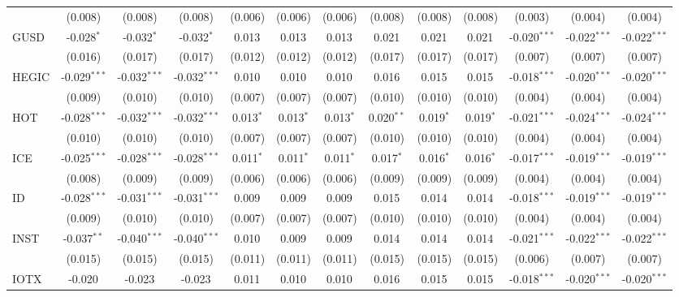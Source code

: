 \begin{table}[!htbp]
\begin{tabular}{@{\extracolsep{5pt}}lcccccccccccc}
  & (0.008) & (0.008) & (0.008) & (0.006) & (0.006) & (0.006) & (0.008) & (0.008) & (0.008) & (0.003) & (0.004) & (0.004) \\
 GUSD & -0.028$^{*}$ & -0.032$^{*}$ & -0.032$^{*}$ & 0.013$^{}$ & 0.013$^{}$ & 0.013$^{}$ & 0.021$^{}$ & 0.021$^{}$ & 0.021$^{}$ & -0.020$^{***}$ & -0.022$^{***}$ & -0.022$^{***}$ \\
  & (0.016) & (0.017) & (0.017) & (0.012) & (0.012) & (0.012) & (0.017) & (0.017) & (0.017) & (0.007) & (0.007) & (0.007) \\
 HEGIC & -0.029$^{***}$ & -0.032$^{***}$ & -0.032$^{***}$ & 0.010$^{}$ & 0.010$^{}$ & 0.010$^{}$ & 0.016$^{}$ & 0.015$^{}$ & 0.015$^{}$ & -0.018$^{***}$ & -0.020$^{***}$ & -0.020$^{***}$ \\
  & (0.009) & (0.010) & (0.010) & (0.007) & (0.007) & (0.007) & (0.010) & (0.010) & (0.010) & (0.004) & (0.004) & (0.004) \\
 HOT & -0.028$^{***}$ & -0.032$^{***}$ & -0.032$^{***}$ & 0.013$^{*}$ & 0.013$^{*}$ & 0.013$^{*}$ & 0.020$^{**}$ & 0.019$^{*}$ & 0.019$^{*}$ & -0.021$^{***}$ & -0.024$^{***}$ & -0.024$^{***}$ \\
  & (0.010) & (0.010) & (0.010) & (0.007) & (0.007) & (0.007) & (0.010) & (0.010) & (0.010) & (0.004) & (0.004) & (0.004) \\
 ICE & -0.025$^{***}$ & -0.028$^{***}$ & -0.028$^{***}$ & 0.011$^{*}$ & 0.011$^{*}$ & 0.011$^{*}$ & 0.017$^{*}$ & 0.016$^{*}$ & 0.016$^{*}$ & -0.017$^{***}$ & -0.019$^{***}$ & -0.019$^{***}$ \\
  & (0.008) & (0.009) & (0.009) & (0.006) & (0.006) & (0.006) & (0.009) & (0.009) & (0.009) & (0.004) & (0.004) & (0.004) \\
 ID & -0.028$^{***}$ & -0.031$^{***}$ & -0.031$^{***}$ & 0.009$^{}$ & 0.009$^{}$ & 0.009$^{}$ & 0.015$^{}$ & 0.014$^{}$ & 0.014$^{}$ & -0.018$^{***}$ & -0.019$^{***}$ & -0.019$^{***}$ \\
  & (0.009) & (0.010) & (0.010) & (0.007) & (0.007) & (0.007) & (0.010) & (0.010) & (0.010) & (0.004) & (0.004) & (0.004) \\
 INST & -0.037$^{**}$ & -0.040$^{***}$ & -0.040$^{***}$ & 0.010$^{}$ & 0.009$^{}$ & 0.009$^{}$ & 0.014$^{}$ & 0.014$^{}$ & 0.014$^{}$ & -0.021$^{***}$ & -0.022$^{***}$ & -0.022$^{***}$ \\
  & (0.015) & (0.015) & (0.015) & (0.011) & (0.011) & (0.011) & (0.015) & (0.015) & (0.015) & (0.006) & (0.007) & (0.007) \\
 IOTX & -0.020$^{}$ & -0.023$^{}$ & -0.023$^{}$ & 0.011$^{}$ & 0.010$^{}$ & 0.010$^{}$ & 0.016$^{}$ & 0.015$^{}$ & 0.015$^{}$ & -0.018$^{***}$ & -0.020$^{***}$ & -0.020$^{***}$ \\

\end{tabular}
\end{table}
